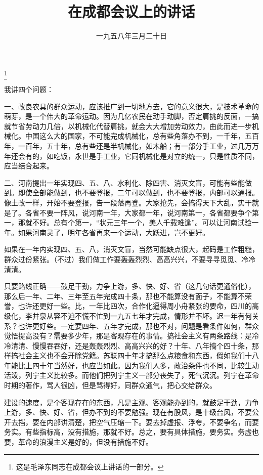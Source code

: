 
\title{在成都会议上的讲话}
\date{一九五八年三月二十日}
\thanks{这是毛泽东同志在成都会议上讲话的一部分。}
\maketitle


我讲四个问题：

一、改良农具的群众运动，应该推广到一切地方去，它的意义很大，是技术革命的萌芽，是一个伟大的革命运动。因为几亿农民在动手动脚，否定肩挑的反面，一搞就节省劳动力几倍，以机械化代替肩挑，就会大大增加劳动效力，由此而进一步机械化。中国这么大的国家，不可能完成机械化，总有些角落办不到，一千年，五百年，一百年，五十年，总有些还是半机械化，如木船；有一部分手工业，过几万万年还会有的，如吃饭，永世是手工业，它同机械化是对立的统一，只是性质不同，应当结合起来。

二、河南提出一年实现四、五、八、水利化、除四害、消灭文盲，可能有些能做到。即使全部能做到，也不要登报，二年可以做到，也不要登报，内部可以通报。像土改一样，开始不要登报，告一段落再登。大家抢先，会搞得天下大乱，实干就是了。各省不要一阵风，说河南一年，大家都一年，说河南第一，各省都要争个第一，那就不好。总有个第一，“状元三年一个，美人千载难逢”。可以让河南试验一年。如果河南灵了，明年各省再来一个运动，大跃进，岂不更好。

如果在一年内实现四、五、八，消灭文盲，当然可能缺点很大，起码是工作粗糙，群众过份紧张。（不过）我们做工作要轰轰烈烈、高高兴兴，不要寻寻觅觅、冷冷清清。

只要路线正确——鼓足干劲，力争上游，多、快、好、省（这几句话更通俗化），那么后一年、二年、三年至五年完成四十条，那也不能算没有面子，不能算不荣誉，也许还更好一些。比，一年比四次，合作化逼得周小舟紧张的要命，四川的高级化，李井泉从容不迫不慌不忙到一九五七年才完成，情形并不坏。迟一年有何关系？也许更好些。一定要四年、五年才完成，那也不对，问题是看条件如何，群众觉悟提高没有？需要多少年，那是客观存在的事情。搞社会主义有两条路线：是冷冷清清、慢慢吞吞好，还是轰轰烈烈、高高兴兴的好？十年、八年搞个四十条，那样搞社会主义也不会开除党籍。苏联四十年才搞那么点粮食和东西，假如我们十八年能比上四十年当然好，也应当如此。因为我们人多，政治条件也不同，比较生动活泼，列宁主义比较多。而他们把列宁主义一部分丧失了，死气沉沉。列宁在革命时期的著作，骂人很凶，但是骂得好，同群众通气，把心交给群众。

建设的速度，是个客现存在的东西，凡是主观、客观能办到的，就鼓足干劲，力争上游，多、快、好、省，但办不到的不要勉强。现在有股风，是十级台风，不要公开去挡，要在内部讲清楚，把空气压缩一下。要去掉虚报、浮夸，不要争名，而要务实。有些指标高，没有措施，那就不好。总之，要有具体措施，要务实。务虚也要，革命的浪漫主义是好的，但没有措施不好。

